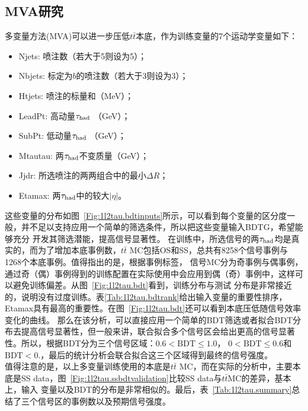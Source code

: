 \subsection{MVA研究}
多变量方法(MVA)可以进一步压低$t\bar{t}$本底，作为训练变量的7个运动学变量如下：
\begin{itemize}
 \item Njets: 喷注数（若大于5则设为5）；
 \item Nbjets: 标定为$b$的喷注数（若大于3则设为3）；
 \item Htjets: 喷注\pt 的标量和（MeV）；
 \item LeadPt: 高动量$\tau_{\text{had}}$ \pt （GeV）；
 \item SubPt: 低动量$\tau_{\text{had}}$ \pt （GeV）；
 \item Mtautau: 两$\tau_{\text{had}}$不变质量（GeV）；
 \item Jjdr: 所选喷注的两两组合中的最小$\Delta R$；
 \item Etamax: 两$\tau_{\text{had}}$中的较大$|\eta|$。
\end{itemize}
这些变量的分布如图~\ref{Fig:1l2tau.bdtinputs}所示，可以看到每个变量的区分度一般，并不足以支持应用一个简单的筛选条件，所以把这些变量输入BDTG，希望能够充分
开发其筛选潜能，提高信号显著性。
在训练中，所选信号的两$\tau_{\text{had}}$均是真实的，而为了增加本底事例数，$t\bar{t}$ MC包括OS和SS，总共有8258个信号事例与1268个本底事例。值得指出的是，根据事例标签，
信号MC分为奇事例与偶事例，通过奇（偶）事例得到的训练配置在实际使用中会应用到偶（奇）事例中，这样可以避免训练偏差。从图~\ref{Fig:1l2tau.bdt}看到，训练分布与测试
分布是非常接近的，说明没有过度训练。表\ref{Tab:1l2tau.bdtrank}给出输入变量的重要性排序，Etamax具有最高的重要性。在图~\ref{Fig:1l2tau.bdt}还可以看到本底压低随信号效率变化的曲线。
那么在该分析，可以直接应用一个简单的BDT筛选或者拟合BDT分布去提高信号显著性，但一般来讲，联合拟合多个信号区会给出更高的信号显著性。所以，根据BDT分为三个信号区域：$0.6<\text{BDT}\le 1.0$，
$0<\text{BDT}\le 0.6$和$\text{BDT}<0.$，最后的统计分析会联合拟合这三个区域得到最终的信号强度。\\
值得注意的是，以上多变量训练使用的本底是$t\bar{t}$ MC，而在实际的分析中，主要本底是SS data，图~\ref{Fig:1l2tau.ssbdtvalidation}比较SS data与$t\bar{t}$MC的差异，基本上，输入
变量以及BDT的分布是非常相似的。最后，表~\ref{Tab:1l2tau.summary}总结了三个信号区的事例数以及预期信号强度。
